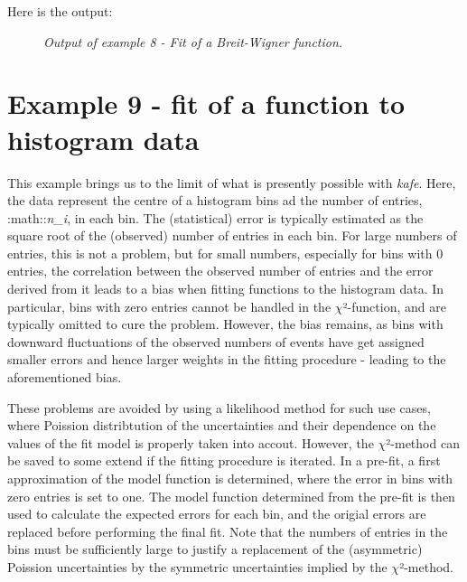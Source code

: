 \documentclass[a4paper,10pt,english]{sphinxmanual}
\begin{document}
Here is the output:
\begin{figure}[htbp]
\centering
\capstart

\caption{\emph{Output of example 8 - Fit of a Breit-Wigner function.}}\end{figure}


\section{Example 9 - fit of a function to histogram data}
\label{index:example-9-fit-of-a-function-to-histogram-data}
This example brings us to the limit of what is presently
possible with \emph{kafe}. Here, the data represent the
centre of a histogram bins ad the number of entries, :math::\emph{n\_i},
in each bin. The (statistical) error is typically estimated
as the square root of the (observed) number of entries in each bin.
For large numbers of entries, this is not a problem,
but for small numbers, especially for bins with 0 entries,
the correlation between the observed number of entries and
the error derived from it leads to a bias when fitting
functions to the histogram data. In particular, bins with
zero entries cannot be handled in the \(\chi\)²-function, and are
typically omitted to cure the problem.  However, the bias
remains, as bins with downward fluctuations of the
observed numbers of events have get assigned smaller errors
and hence larger weights in the fitting procedure - leading
to the aforementioned bias.

These problems are avoided by using a likelihood method for
such use cases, where Poission distribtution of the uncertainties
and their dependence on the values of the fit model is properly
taken into accout. However, the \(\chi\)²-method can be saved to some
extend if the fitting procedure is iterated. In a pre-fit, a
first approximation of the model function is determined, where
the error in bins with zero entries is set to one. The model
function determined from the pre-fit is then used to calculate
the expected errors for each bin, and the origial errors are
replaced before performing the final fit. Note that the numbers
of entries in the bins must be sufficiently large to justify
a replacement of the (asymmetric) Poission uncertainties by
the symmetric uncertainties implied by the \(\chi\)²-method.
\end{document}
